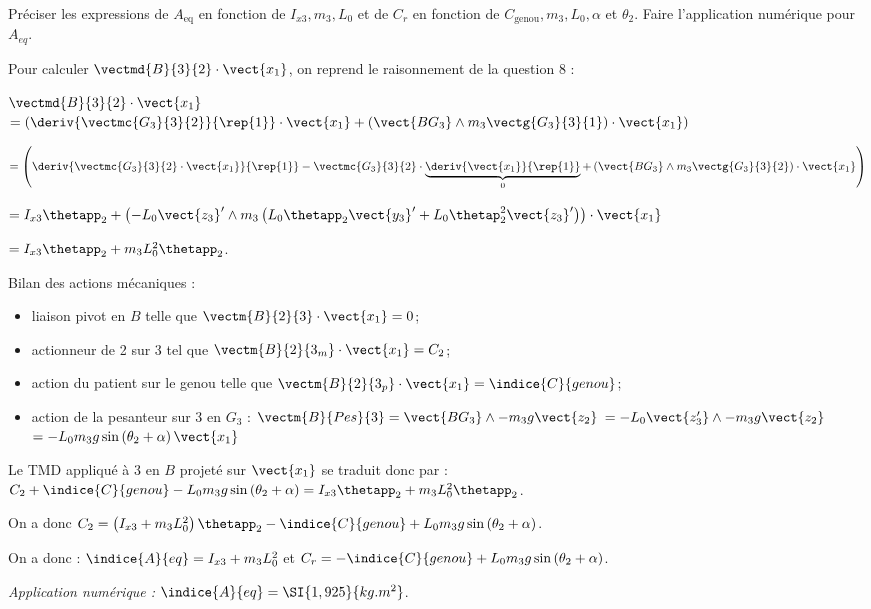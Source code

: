 \documentclass[11pt]{article}
\begin{document}
Préciser les expressions de $A_{\textrm{eq}}$ en fonction de $I_{x 3}, m_{3}, L_{0}$ et de $C_{r}$ en fonction de $C_{\textrm{genou}}, m_{3}, L_{0}, \alpha$ et $\theta_{2}$. Faire l'application numérique pour $A_{e q}$.
\begin{UPSTIcorrige}

Pour calculer $\vectmd{B}{3}{2} \cdot \vect{x_1}$, on reprend le raisonnement de la question 8 :  

 $\vectmd{B}{3}{2} \cdot \vect{x_1}$  
$= \left(\deriv{\vectmc{G_3}{3}{2}}{\rep{1}} \cdot \vect{x_1} + \left(\vect{BG_3} \wedge m_3 \vectg{G_3}{3}{1}\right)\cdot \vect{x_1} \right)  $

$= \left(\deriv{\vectmc{G_3}{3}{2}\cdot \vect{x_1}}{\rep{1}} - \vectmc{G_3}{3}{2}\cdot \underbrace{\deriv{ \vect{x_1}}{\rep{1}}}_{0}   + \left(\vect{BG_3} \wedge m_3 \vectg{G_3}{3}{2}\right)\cdot \vect{x_1} \right)  $

$=I_{x3}\thetapp_2 +\left( -L_0 \vect{z_3}'	 \wedge m_3  \left( L_0 \thetapp_2 \vect{y_3}' +L_0 \thetap_2^2 \vect{z_3}' \right)\right)\cdot \vect{x_1}$


$=I_{x3}\thetapp_2 + m_3 L_0^2 \thetapp_2  $.

Bilan des actions mécaniques : 
\begin{itemize}
\item liaison pivot en $B$ telle que $\vectm{B}{2}{3}\cdot \vect{x_1} = 0$;
\item actionneur de 2 sur 3 tel que  $\vectm{B}{2}{3_m}\cdot \vect{x_1} = C_2$;
\item action du patient sur le genou telle que  $\vectm{B}{2}{3_p}\cdot \vect{x_1} = \indice{C}{genou}$;
\item action de la pesanteur sur 3 en $G_3$ : $\vectm{B}{Pes}{3} = \vect{BG_3}\wedge -m_3 g\vect{z_2}$ $= -L_0 \vect{z_3'}\wedge -m_3 g\vect{z_2}$
$= - L_0 m_3 g \sin\left(\theta_2 + \alpha\right)\vect{x_1}$
\end{itemize}

Le TMD appliqué à 3 en $B$ projeté sur $\vect{x_1}$ se traduit donc par : 
$C_2 +\indice{C}{genou} - L_0 m_3 g \sin\left(\theta_2 + \alpha\right)=I_{x3}\thetapp_2 + m_3 L_0^2 \thetapp_2  $.

On a donc $C_2 = \left( I_{x3} + m_3 L_0^2 \right)\thetapp_2  - \indice{C}{genou} + L_0 m_3 g \sin\left(\theta_2 + \alpha\right) $.

On a donc : $\indice{A}{eq} = I_{x3} + m_3 L_0^2$ et $C_r =  - \indice{C}{genou} + L_0 m_3 g \sin\left(\theta_2 + \alpha\right)$.

\textit{Application numérique :} $\indice{A}{eq} =\SI{1,925}{kg.m^2}$.
\end{UPSTIcorrige}
\end{document}
